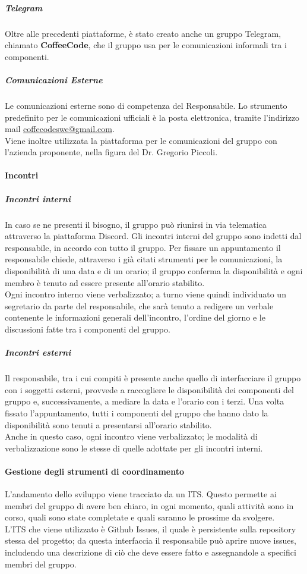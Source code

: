 \documentclass[../norme-di-progetto.tex]{subfiles}
\begin{document}
\subparagraph*{Telegram}
Oltre alle precedenti piattaforme, è stato creato anche un gruppo Telegram, chiamato \textbf{CoffeeCode}, che il gruppo usa per le comunicazioni informali tra i componenti.

\subparagraph{Comunicazioni Esterne}
Le comunicazioni esterne sono di competenza del Responsabile. Lo strumento predefinito per le comunicazioni ufficiali è la posta elettronica, tramite l'indirizzo mail \href{coffecodeswe@gmail.com}{coffecodeswe@gmail.com}. \\
Viene inoltre utilizzata la piattaforma  per le comunicazioni del gruppo con l'azienda proponente, nella figura del Dr. Gregorio Piccoli.

\paragraph{Incontri}
\subparagraph{Incontri interni}
In caso se ne presenti il bisogno, il gruppo può riunirsi in via telematica attraverso la piattaforma Discord. Gli incontri interni del gruppo sono indetti dal responsabile, in accordo con tutto il gruppo. Per fissare un appuntamento il responsabile chiede, attraverso i già citati strumenti per le comunicazioni, la disponibilità di una data e di un orario; il gruppo conferma la disponibilità e ogni membro è tenuto ad essere presente all'orario stabilito. \\
Ogni incontro interno viene verbalizzato; a turno viene quindi individuato un segretario da parte del responsabile, che sarà tenuto a redigere un verbale contenente le informazioni generali dell'incontro, l'ordine del giorno e le discussioni fatte tra i componenti del gruppo.

\subparagraph{Incontri esterni}
Il responsabile, tra i cui compiti è presente anche quello di interfacciare il gruppo con i soggetti esterni, provvede a raccogliere le disponibilità dei componenti del gruppo e, successivamente, a mediare la data e l'orario con i terzi. Una volta fissato l'appuntamento, tutti i componenti del gruppo che hanno dato la disponibilità sono tenuti a presentarsi all'orario stabilito. \\
Anche in questo caso, ogni incontro viene verbalizzato; le modalità di verbalizzazione sono le stesse di quelle adottate per gli incontri interni.

\paragraph{Gestione degli strumenti di coordinamento}
L'andamento dello sviluppo viene tracciato da un ITS. Questo permette ai membri del gruppo di avere ben chiaro, in ogni momento, quali attività sono in corso, quali sono state completate e quali saranno le prossime da svolgere. \\
L'ITS che viene utilizzato è Github Issues, il quale è persistente sulla repository stessa del progetto; da questa interfaccia il responsabile può aprire nuove issues, includendo una descrizione di ciò che deve essere fatto e assegnandole a specifici membri del gruppo.
\end{document}
